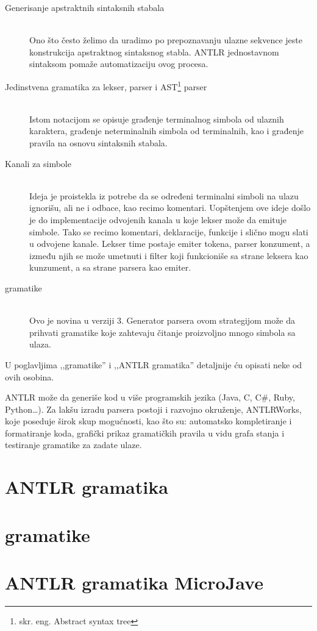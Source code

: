 \begin{description}
	\item[Generisanje apstraktnih sintaksnih stabala] \hfill \\
	Ono što često želimo da uradimo po prepoznavanju ulazne sekvence jeste konstrukcija apstraktnog sintaksnog stabla. ANTLR jednostavnom sintaksom pomaže automatizaciju ovog procesa.
	\item[Jedinstvena gramatika za lekser, parser i AST\footnote{skr. eng. Abstract syntax tree}  parser] \hfill \\
	Istom notacijom se opisuje građenje terminalnog simbola od ulaznih karaktera, građenje neterminalnih simbola od terminalnih, kao i građenje pravila na osnovu sintaksnih stabala.
	\item[Kanali za simbole] \hfill \\
	Ideja je proistekla iz potrebe da se određeni terminalni simboli na ulazu ignorišu, ali ne i odbace, kao recimo komentari. Uopštenjem ove ideje došlo je do implementacije odvojenih kanala u koje lekser može da emituje simbole. Tako se recimo komentari, deklaracije, funkcije i slično mogu slati u odvojene kanale. Lekser time postaje emiter tokena, parser konzument, a između njih se može umetnuti i filter koji funkcioniše sa strane leksera kao kunzument, a sa strane parsera kao emiter.
	\item [\LLa gramatike] \hfill \\
	Ovo je novina u verziji 3. Generator parsera ovom strategijom može da prihvati gramatike koje zahtevaju čitanje proizvoljno mnogo simbola sa ulaza.

\end{description}

  U poglavljima ,,\LLa gramatike'' i ,,ANTLR gramatika'' detaljnije ću opisati neke od ovih osobina.
  
  ANTLR može da generiše kod u više programskih jezika (Java, C, C\#, Ruby, Python\ldots). Za lakšu izradu parsera postoji i razvojno okruženje, ANTLRWorks, koje poseduje širok skup mogućnosti, kao što su: automatsko kompletiranje i formatiranje koda, grafički prikaz gramatičkih pravila u vidu grafa stanja i testiranje gramatike za zadate ulaze.


\section{ANTLR gramatika}


\section{\LLa gramatike}





\section{ANTLR gramatika MicroJave}
